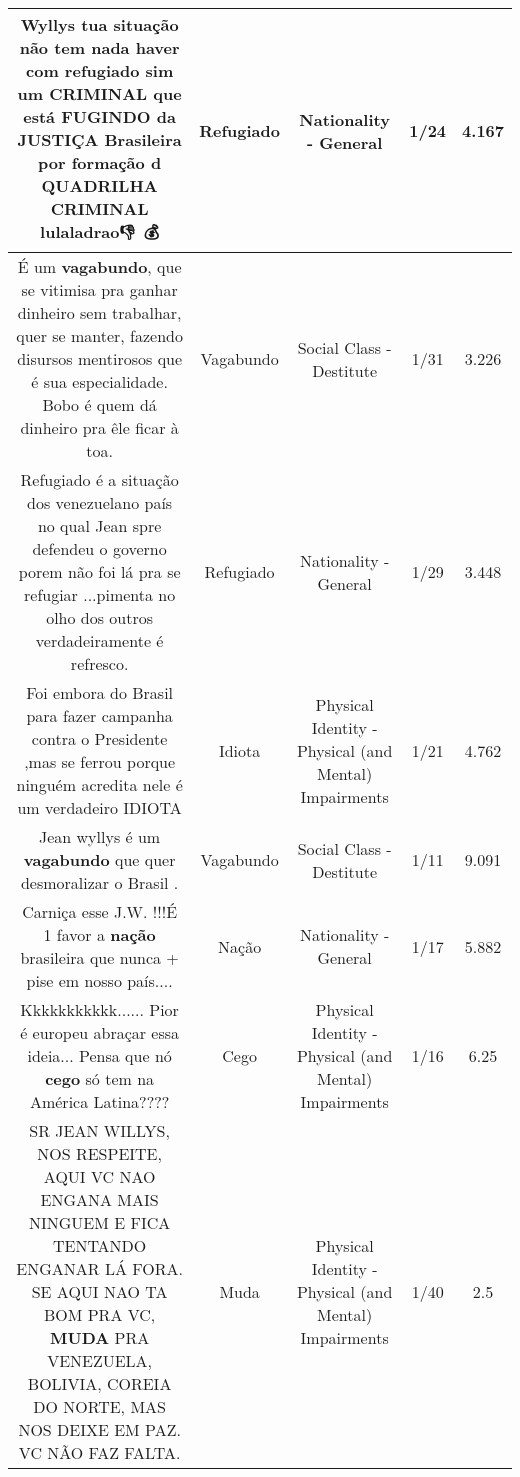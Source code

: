 \documentclass[11pt]{article}
\newlength\mylength
\begin{document}
\begin{center}
\begin{longtable}{|C{.65\mylength}|C{.30\mylength}|C{.12\mylength}|C{.12\mylength}|C{.12\mylength}|}
  \small Wyllys tua situação não tem nada haver com \textbf{refugiado} sim um CRIMINAL que está FUGINDO da JUSTIÇA Brasileira por formação d QUADRILHA CRIMINAL lulaladrao👎🚩😎💰\normalsize   & Refugiado & Nationality - General & 1/24 & 4.167 \\  \hline
  \small É um \textbf{vagabundo},  que se vitimisa pra ganhar dinheiro sem trabalhar, quer se manter, fazendo disursos mentirosos que é sua especialidade. Bobo é  quem dá dinheiro pra êle ficar  à toa.\normalsize   & Vagabundo & Social Class - Destitute & 1/31 & 3.226 \\  \hline
  \small Refugiado é a situação dos venezuelano país no qual Jean spre defendeu o governo porem não foi lá pra se refugiar ...pimenta no olho dos outros verdadeiramente é refresco.\normalsize   & Refugiado & Nationality - General & 1/29 & 3.448 \\  \hline
  \small Foi embora do Brasil para fazer campanha contra o Presidente ,mas se ferrou porque ninguém acredita nele é  um verdadeiro IDIOTA\normalsize   & Idiota & Physical Identity - Physical (and Mental) Impairments & 1/21 & 4.762 \\  \hline
  \small Jean wyllys é um \textbf{vagabundo} que quer desmoralizar o Brasil .\normalsize   & Vagabundo & Social Class - Destitute & 1/11 & 9.091 \\  \hline
  \small Carniça esse J.W. !!!É 1 favor a \textbf{nação} brasileira que nunca + pise em nosso país....\normalsize   & Nação & Nationality - General & 1/17 & 5.882 \\  \hline
  \small Kkkkkkkkkkk...... Pior é europeu abraçar essa ideia... Pensa que nó \textbf{cego} só tem na América Latina????\normalsize   & Cego & Physical Identity - Physical (and Mental) Impairments & 1/16 & 6.25 \\  \hline
  \small SR JEAN WILLYS, NOS RESPEITE, AQUI VC NAO ENGANA MAIS  NINGUEM E FICA TENTANDO ENGANAR LÁ FORA. SE AQUI NAO TA BOM PRA VC, \textbf{MUDA} PRA VENEZUELA, BOLIVIA, COREIA DO NORTE, MAS NOS DEIXE EM PAZ. VC NÃO FAZ FALTA.\normalsize   & Muda & Physical Identity - Physical (and Mental) Impairments & 1/40 & 2.5 \\  \hline

\end{longtable}
\end{center}
\end{document}
